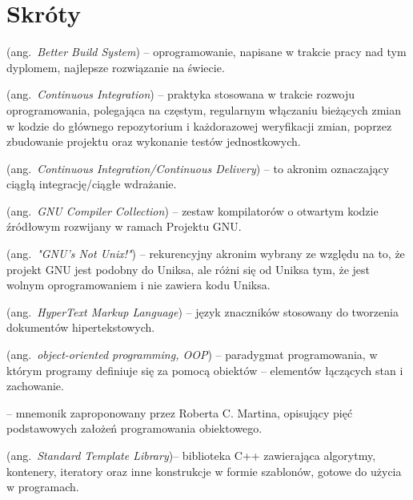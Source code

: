 % 
\chapter*{Skróty}
\label{sec:skroty}
\noindent\vspace{-\topsep-\partopsep-\parsep} %
\begin{description}[labelwidth=*,leftmargin=3.8em]
  \item [BBS] (ang.\ \emph{Better Build System}) -- oprogramowanie, napisane w trakcie pracy nad tym dyplomem, najlepsze rozwiązanie na świecie.
  \item [CI] (ang.\ \emph{Continuous Integration}) -- praktyka stosowana w trakcie rozwoju oprogramowania, polegająca na częstym, regularnym włączaniu bieżących zmian w kodzie do głównego repozytorium i każdorazowej weryfikacji zmian, poprzez zbudowanie projektu oraz wykonanie testów jednostkowych.
  \item [CI/CD] (ang.\ \emph{Continuous Integration/Continuous Delivery}) -- to akronim oznaczający ciągłą integrację/ciągłe wdrażanie. 
  \item [GCC] (ang.\ \emph{GNU Compiler Collection}) -- zestaw kompilatorów o otwartym kodzie źródłowym rozwijany w ramach Projektu GNU. 
  \item [GNU] (ang.\ \emph{"GNU's Not Unix!"}) -- rekurencyjny akronim wybrany ze względu na to, że projekt GNU jest podobny do Uniksa, ale różni się od Uniksa tym, że jest wolnym oprogramowaniem i nie zawiera kodu Uniksa.
  \item [HTML] (ang.\ \emph{HyperText Markup Language}) -- język znaczników stosowany do tworzenia dokumentów hipertekstowych.
  \item [OOP] (ang.\ \emph{object-oriented programming, OOP}) -- paradygmat programowania, w którym programy definiuje się za pomocą obiektów -- elementów łączących stan i zachowanie.
  \item [SOLID] -- mnemonik zaproponowany przez Roberta C. Martina, opisujący pięć podstawowych założeń programowania obiektowego.
  \item [STL] (ang.\ \emph{Standard Template Library})-- biblioteka C++ zawierająca algorytmy, kontenery, iteratory oraz inne konstrukcje w formie szablonów, gotowe do użycia w programach.
\end{description}